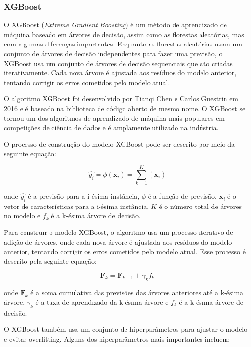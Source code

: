 \subsubsection{XGBoost}

O XGBoost (\textit{Extreme Gradient Boosting}) é um método de aprendizado de máquina baseado em árvores de decisão, assim como as florestas aleatórias, mas com algumas diferenças importantes. Enquanto as florestas aleatórias usam um conjunto de árvores de decisão independentes para fazer uma previsão, o XGBoost usa um conjunto de árvores de decisão sequenciais que são criadas iterativamente. Cada nova árvore é ajustada aos resíduos do modelo anterior, tentando corrigir os erros cometidos pelo modelo atual.

O algoritmo XGBoost foi desenvolvido por Tianqi Chen e Carlos Guestrin em 2016 \citep{Chen:2016} e é baseado na biblioteca de código aberto de mesmo nome. O XGBoost se tornou um dos algoritmos de aprendizado de máquina mais populares em competições de ciência de dados e é amplamente utilizado na indústria.

O processo de construção do modelo XGBoost pode ser descrito por meio da seguinte equação:

\begin{equation}
    \hat{y_i} = \phi(\mathbf{x}_i) = \sum_{k=1}^{K}(\mathbf{x}_i)
\end{equation}

onde $\hat{y_i}$ é a previsão para a i-ésima instância, $\phi$ é a função de previsão, $\mathbf{x}_i$ é o vetor de características para a i-ésima instância, $K$ é o número total de árvores no modelo e $f_k$ é a k-ésima árvore de decisão.

Para construir o modelo XGBoost, o algoritmo usa um processo iterativo de adição de árvores, onde cada nova árvore é ajustada aos resíduos do modelo anterior, tentando corrigir os erros cometidos pelo modelo atual. Esse processo é descrito pela seguinte equação:

\begin{equation}
    \mathbf{F}_k = \mathbf{F}_{k-1} + \gamma_k f_k
\end{equation}

onde $\mathbf{F}_k$ é a soma cumulativa das previsões das árvores anteriores até a k-ésima árvore, $\gamma_k$ é a taxa de aprendizado da k-ésima árvore e $f_k$ é a k-ésima árvore de decisão.

O XGBoost também usa um conjunto de hiperparâmetros para ajustar o modelo e evitar overfitting. Alguns dos hiperparâmetros mais importantes incluem:

